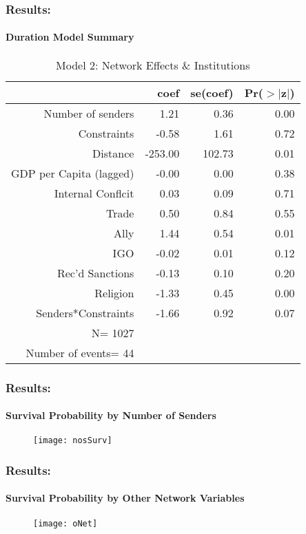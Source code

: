 \documentclass{beamer}
\begin{document}
\begin{frame}
\frametitle{Results:}
\framesubtitle{Duration Model Summary}

%
\begin{table}[ht]
\caption{Model 2: Network Effects \& Institutions}
\begin{center}
\begin{tabular}{rrrr}
  \hline
 & coef & se(coef) & Pr($>$$|$z$|$) \\ 
  \hline
Number of senders & 1.21 & 0.36 & 0.00 \\ 
  Constraints & -0.58 & 1.61 & 0.72 \\ 
  Distance & -253.00 & 102.73 & 0.01 \\ 
  GDP per Capita (lagged) & -0.00 & 0.00 & 0.38 \\ 
  Internal Conflcit & 0.03 & 0.09 & 0.71 \\ 
  Trade & 0.50 & 0.84 & 0.55 \\ 
  Ally & 1.44 & 0.54 & 0.01 \\ 
  IGO & -0.02 & 0.01 & 0.12 \\ 
  Rec'd Sanctions & -0.13 & 0.10 & 0.20 \\ 
  Religion & -1.33 & 0.45 & 0.00 \\ 
  Senders*Constraints & -1.66 & 0.92 & 0.07 \\ 
   \hline
     N= 1027 &&&\\
     Number of events= 44 &&&\\
     \hline
\end{tabular}
\end{center}
\end{table}

\end{frame}

\begin{frame}
\frametitle{Results:}
\framesubtitle{Survival Probability by Number of Senders}

\vspace{0.7cm}
\begin{figure}[ht]
	\centering
	\texttt{[image: nosSurv]}
\end{figure}

\end{frame}

\begin{frame}
\frametitle{Results:}	
\framesubtitle{Survival Probability by Other Network Variables}

\begin{figure}[ht]
	\centering
	\texttt{[image: oNet]}
\end{figure}

\end{frame}
\end{document}
